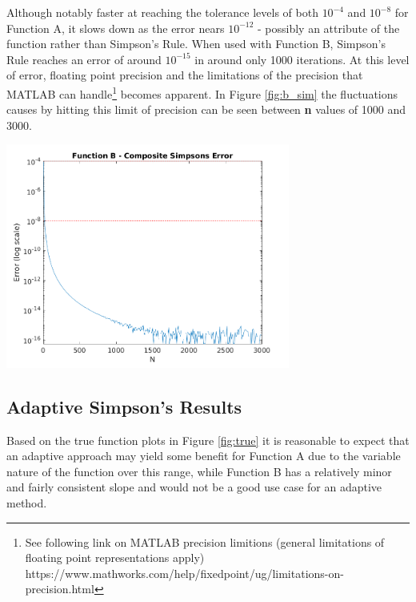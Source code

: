 \documentclass[a4paper]{article}
\begin{document}
Although notably faster at reaching the tolerance levels of both $10^{-4}$ and $10^{-8}$ for Function A, it slows down as the error nears $10^{-12}$ - possibly an attribute of the function rather than Simpson's Rule. When used with Function B, Simpson's Rule reaches an error of around $10^{-15}$ in around only 1000 iterations. At this level of error, floating point precision and the limitations of the precision that MATLAB can handle\footnote{See following link on MATLAB precision limitions (general limitations of floating point representations apply) https://www.mathworks.com/help/fixedpoint/ug/limitations-on-precision.html} becomes apparent. In Figure \ref{fig:b_sim} the fluctuations causes by hitting this limit of precision can be seen between \textbf{n} values of 1000 and 3000. 
 
\begin{center}
	\includegraphics[width=0.7\textwidth]{../output/b_simpsons.png}
	\label{fig:b_sim}
\end{center}



\subsection{Adaptive Simpson's Results}\label{results:adaptive}

Based on the true function plots in Figure \ref{fig:true} it is reasonable to expect that an adaptive approach may yield some benefit for Function A due to the variable nature of the function over this range, while Function B has a relatively minor and fairly consistent slope and would not be a good use case for an adaptive method.
\end{document}
